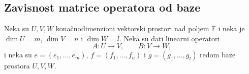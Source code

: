 \documentclass[a4paper,12pt,twoside]{report}
\numberwithin{algorithm}{section}
\begin{document}

\subsection{Zavisnost matrice operatora od baze}
Neka su $U, V, W$ konačnodimenzioni vektorski prostori nad poljem $\mathbb{F}$ i neka je 
$\dim U = m$, $\dim V = n$ i $\dim W = l$. 
Neka su dati linearni operatori 
\[
A: U \to V, \qquad B: V \to W,
\]
i neka su $e = (e_1, \dots, e_m)$, $f = (f_1, \dots, f_n)$ i $g = (g_1, \dots, g_l)$ redom baze prostora $U, V, W$.
\end{document}
